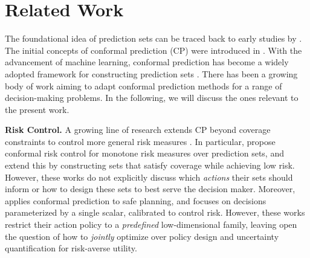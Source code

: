 \section{Related Work}
The foundational idea of prediction sets can be traced back to early studies by \citet{Wilks1941, Wald1943, scheffe1945non, tukey1947non}. The initial concepts of conformal prediction (CP) were introduced in \citet{saunders1999transduction, vovk1999machine,vovk2005algorithmic}. With the advancement of machine learning, conformal prediction has become a widely adopted framework for constructing prediction sets \citep{Vovk2013,papadopoulos2002inductive,lei2018distribution,romano2020classification,romano2019conformalized,park2021pac, angelopoulos2020uncertainty}. There has been a growing body of work aiming to adapt conformal prediction methods for a range of decision-making problems. In the following, we will discuss the ones relevant to the present work. 

 

\textbf{Risk Control.} A growing line of research extends CP beyond coverage constraints to control more general risk measures \citep{lindemann2023safe, angelopoulos2022conformal, angelopoulos2021learn, cortes2024decision, lekeufack2024conformal, zecchin2024adaptive, blot2024automatically, zecchin2024localized}. In particular, \citet{angelopoulos2022conformal} propose conformal risk control for monotone risk measures over prediction sets, and \citet{cortes2024decision} extend this by constructing sets that satisfy coverage while achieving low risk. However,  these works  do not explicitly discuss which \emph{actions} their sets should inform or how to design these sets to best serve the decision maker.  Moreover, \citet{lindemann2023safe} applies conformal prediction to safe planning, and  \citet{lekeufack2024conformal} focuses on decisions parameterized by a single scalar, calibrated to control risk. However,  these works restrict their action policy to a \emph{predefined} low-dimensional family, leaving open the question of how to \emph{jointly} optimize over policy design and uncertainty quantification for risk-averse utility. 

